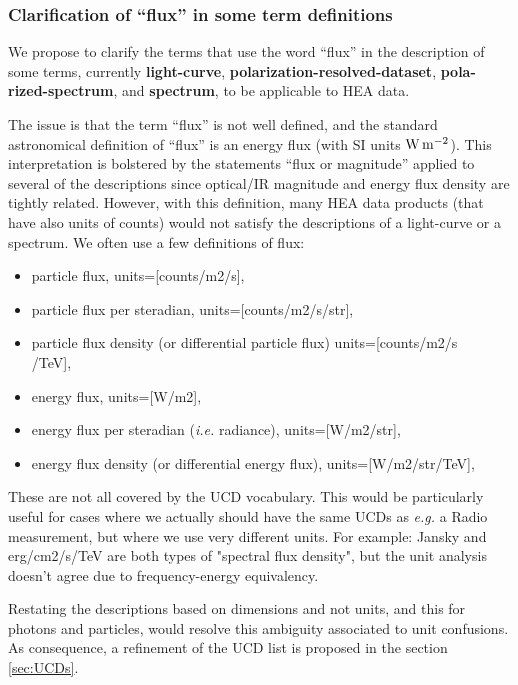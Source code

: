 \documentclass[11pt,a4paper]{ivoa}
\begin{document}


\subsubsection{Clarification of ``flux'' in some term definitions}
\label{sec:flux}

We propose to clarify the terms that use the word ``flux'' in the description of some terms, currently {\bf light-curve}, {\bf polarization-resolved-dataset}, {\bf pola-\\rized-spectrum}, and {\bf spectrum}, to be applicable to \gls{HEA} data.

The issue is that the term ``flux'' is not well defined, and the standard astronomical definition of ``flux''
is an energy flux (with SI units $\rm W\,m^{-2}$).  This interpretation is bolstered by the statements ``flux or magnitude'' applied to several of the descriptions since optical/IR magnitude and energy flux density are tightly related.  However, with this definition, many \gls{HEA} data products (that have also units of counts) would not satisfy the descriptions of a light-curve or a spectrum. We often use a few definitions of flux:
\begin{itemize}
  \item particle flux, units=[counts/m2/s],
  \item particle flux per steradian, units=[counts/m2/s/str],
  \item particle flux density (or differential particle flux) units=[counts/m2/s\\/TeV],
  \item energy flux, units=[W/m2],
  \item energy flux per steradian ({\em i.e.\/} radiance), units=[W/m2/str],
  \item energy flux density (or differential energy flux), units=[W/m2/str/TeV],
\end{itemize}

These are not all covered by the UCD vocabulary. This would be particularly useful for cases where we actually should have the same UCDs as {\em e.g.\/} a Radio measurement, but where we use very different units. For example: Jansky and erg/cm2/s/TeV are both types of "spectral flux density", but the unit analysis doesn't agree due to frequency-energy equivalency.

Restating the descriptions based on dimensions and not units, and this for photons and particles, would resolve this ambiguity associated to unit confusions. As consequence, a refinement of the UCD list is proposed in the section \ref{sec:UCDs}.
\end{document}
